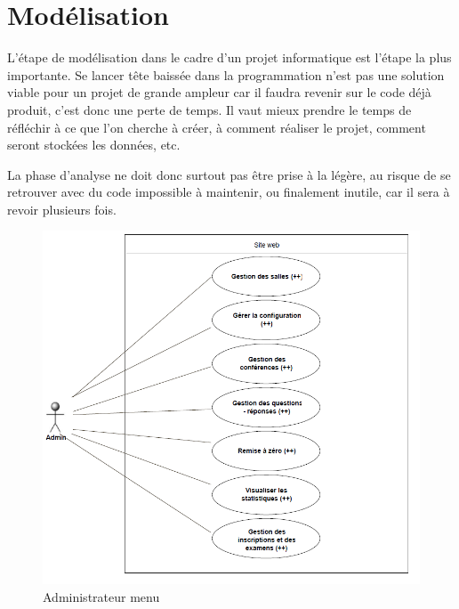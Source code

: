 \chapter{Modélisation}

L'étape de modélisation dans le cadre d'un projet informatique est l'étape la plus importante.
Se lancer tête baissée dans la programmation n'est pas une solution viable pour un projet
de grande ampleur car il faudra revenir sur le code déjà produit, c'est donc une perte de
temps. Il vaut mieux prendre le temps de réfléchir à ce que l'on cherche à créer, à comment
réaliser le projet, comment seront stockées les données, etc.

La phase d'analyse ne doit donc surtout pas être prise à la légère, au risque de se retrouver
avec du code impossible à maintenir, ou finalement inutile, car il sera à revoir plusieurs fois.

    \begin{figure}[h]
        \begin{center}
            \includegraphics[scale=0.85]{images/uml/adminMenu.png} 
        \end{center}

        \caption{Administrateur menu}
        \label{a=Administrateur menu}
    \end{figure}


